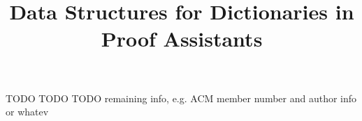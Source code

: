 \documentclass[nonacm]{acmart}
\theoremstyle{slplain}
\numberwithin{thm}{section}
\begin{document}
\title{Data Structures for Dictionaries in Proof Assistants}




TODO TODO TODO remaining info, e.g. ACM member number and author info or whatev





\maketitle
\thispagestyle{empty} %
\end{document}
